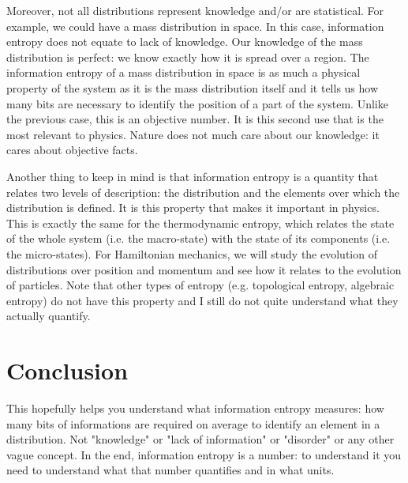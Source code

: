 \documentclass[aps,pra,10pt,floatfix,nofootinbib]{revtex4-1}
\theoremstyle{definition}
\begin{document}
Moreover, not all distributions represent knowledge and/or are statistical. For example, we could have a mass distribution in space. In this case, information entropy does not equate to lack of knowledge. Our knowledge of the mass distribution is perfect: we know exactly how it is spread over a region. The information entropy of a mass distribution in space is as much a physical property of the system as it is the mass distribution itself and it tells us how many bits are necessary to identify the position of a part of the system. Unlike the previous case, this is an objective number. It is this second use that is the most relevant to physics. Nature does not much care about our knowledge: it cares about objective facts.

Another thing to keep in mind is that information entropy is a quantity that relates two levels of description: the distribution and the elements over which the distribution is defined. It is this property that makes it important in physics. This is exactly the same for the thermodynamic entropy, which relates the state of the whole system (i.e. the macro-state) with the state of its components (i.e. the micro-states). For Hamiltonian mechanics, we will study the evolution of distributions over position and momentum and see how it relates to the evolution of particles. Note that other types of entropy (e.g. topological entropy, algebraic entropy) do not have this property and I still do not quite understand what they actually quantify.

\section{Conclusion}

This hopefully helps you understand what information entropy measures: how many bits of informations are required on average to identify an element in a distribution. Not "knowledge" or "lack of information" or "disorder" or any other vague concept. In the end, information entropy is a number: to understand it you need to understand what that number quantifies and in what units.
\end{document}
